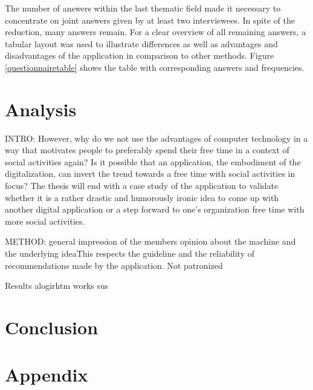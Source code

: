 \documentclass[12pt,numbers=noenddot,parskip,bibliography=totocnumbered,listof=totocnumbered,draft]{scrreprt}
\begin{document}
The number of answers within the last thematic field made it necessary to concentrate on joint answers given by at least two interviewees. In spite of the reduction, many answers remain. For a clear overview of all remaining answers, a tabular layout was used to illustrate differences as well as advantages and disadvantages of the application in comparison to other methods. Figure \ref{questionnairetable} shows the table with corresponding answers and frequencies.

\chapter{Analysis}


INTRO:
However, why do we not use the advantages of computer technology in a way that motivates people to preferably spend their free time in a context of social activities again? Is it possible that an application, the embodiment of the digitalization, can invert the trend towards a free time with social activities in focus?
The thesis will end with a case study of the application to validate whether it is a rather drastic and humorously ironic idea to come up with another digital application or a step forward to one's organization free time with more social activities.

METHOD:
general impression of the members opinion about the machine and the underlying ideaThis respects the guideline and the reliability of recommendations made by the application.
Not patronized

Results
alogirhtm works
sus


\chapter{Conclusion}



\appendix
\chapter{Appendix}

\newpage
\end{document}
